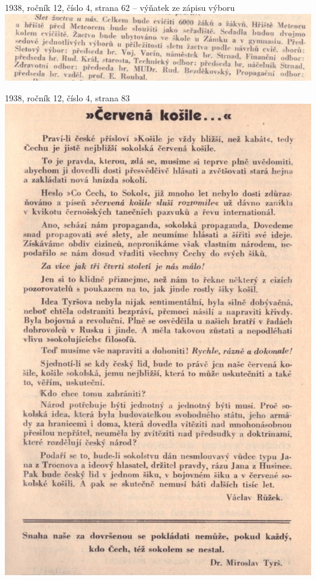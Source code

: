 \documentclass[11pt]{article}
\begin{document}
1938, ročník 12, číslo 4, strana 62 -- výňatek ze zápisu výboru \\
\includegraphics[width=\imagewidth]{original/1938/Skener_20250318 (3).jpg}

1938, ročník 12, číslo 4, strana 83 \\
\includegraphics[width=\imagewidth]{original/1938/Skener_20250318 (4).jpg}
\end{document}
